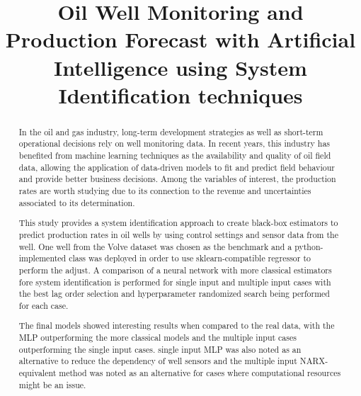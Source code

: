 \documentclass[conference]{IEEEtran}
\begin{document}
\graphicspath{{images/}}

\title{Oil Well Monitoring and Production Forecast with Artificial Intelligence using System Identification techniques}

\author{}

\maketitle

\begin{abstract}
In the oil and gas industry, long-term development strategies as well as short-term operational decisions rely on well monitoring data. In recent years, 
this industry has benefited from machine learning techniques as the availability and quality of oil field data, allowing the application of data-driven models 
to fit and predict field behaviour and provide better business decisions. Among the variables of interest, the production rates are worth studying due to its 
connection to the revenue and uncertainties associated to its determination.

This study provides a system identification approach to create black-box estimators to predict production rates in oil wells by using control settings and sensor 
data from the well. One well from the Volve dataset was chosen as the benchmark and a python-implemented class was deployed in order to use sklearn-compatible 
regressor to perform the adjust. A comparison of a neural network with more classical estimators fore system identification is performed for single input and multiple 
input cases with the best lag order selection and hyperparameter randomized search being performed for each case.

The final models showed interesting results when compared to the real data, with the MLP outperforming the more classical models and the multiple input cases outperforming 
the single input cases. single input MLP was also noted as an alternative to reduce the dependency of well sensors and the multiple input NARX-equivalent method was noted 
as an alternative for cases where computational resources might be an issue.



\end{abstract}
\end{document}
